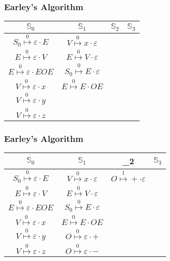 \documentclass{beamer}
\newcommand{\earley}[4]{#1\overset{#4}{\mapsto}#2\cdot#3}
\newcommand{\St}[1]{\mathbb{S}_{#1}}
\begin{document}
	\begin{frame}
		\frametitle{Earley's Algorithm}
		\centering
		\begin{tabular}{|c|c|c|c|}
			\hline
			$\St{0}$                          & $\St{1}$ & $\St{2}$ & $\St{3}$ \\
			\hline
			$\earley{S_0}{\varepsilon}{E}{0}$ & $\earley{V}{x}{\varepsilon}{0}$   &  & \\
			$\earley{E}{\varepsilon}{V}{0}$   & $\earley{E}{V}{\varepsilon}{0}$   &  & \\
			$\earley{E}{\varepsilon}{EOE}{0}$ & $\earley{S_0}{E}{\varepsilon}{0}$ &  & \\
			$\earley{V}{\varepsilon}{x}{0}$   & $\earley{E}{E}{OE}{0}$            &  & \\
			$\earley{V}{\varepsilon}{y}{0}$   &                                   &  & \\
			$\earley{V}{\varepsilon}{z}{0}$   &                                   &  & \\
			\hline
		\end{tabular}
	\end{frame}

	\begin{frame}
		\frametitle{Earley's Algorithm}
		\centering
		\begin{tabular}{|c|c|c|c|}
			\hline
			$\St{0}$                          & $\St{1}$                          &\St{2} & $\St{3}$ \\
			\hline
			$\earley{S_0}{\varepsilon}{E}{0}$ & $\earley{V}{x}{\varepsilon}{0}$   & $\earley{O}{+}{\varepsilon}{1}$ & \\
			$\earley{E}{\varepsilon}{V}{0}$   & $\earley{E}{V}{\varepsilon}{0}$   & & \\
			$\earley{E}{\varepsilon}{EOE}{0}$ & $\earley{S_0}{E}{\varepsilon}{0}$ & & \\
			$\earley{V}{\varepsilon}{x}{0}$   & $\earley{E}{E}{OE}{0}$            & & \\
			$\earley{V}{\varepsilon}{y}{0}$   & $\earley{O}{\varepsilon}{+}{0}$   & & \\
			$\earley{V}{\varepsilon}{z}{0}$   & $\earley{O}{\varepsilon}{-}{0}$   & & \\
			\hline
		\end{tabular}
	\end{frame}
\end{document}
